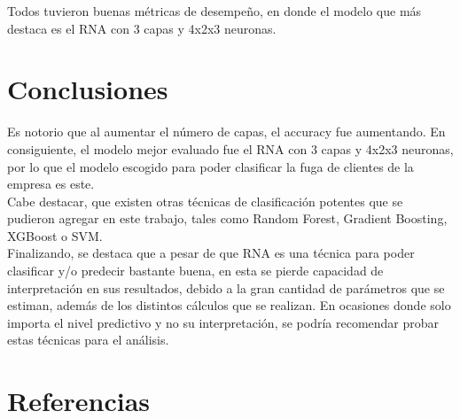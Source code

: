 \documentclass{report}
\begin{document}
Todos tuvieron buenas métricas de desempeño, en donde el modelo que más destaca es el RNA con 3 capas y 4x2x3 neuronas.\\

\chapter{Conclusiones}
Es notorio que al aumentar el número de capas, el accuracy fue aumentando. En consiguiente, el modelo mejor evaluado fue el RNA con 3 capas y 4x2x3 neuronas, por lo que el modelo escogido para poder clasificar la fuga de clientes de la empresa es este.\\

Cabe destacar, que existen otras técnicas de clasificación potentes que se pudieron agregar en este trabajo, tales como Random Forest, Gradient Boosting, XGBoost o SVM.\\

Finalizando, se destaca que a pesar de que RNA es una técnica para poder clasificar y/o predecir bastante buena, en esta se pierde capacidad de interpretación en sus resultados, debido a la gran cantidad de parámetros que se estiman, además de los distintos cálculos que se realizan. En ocasiones donde solo importa el nivel predictivo y no su interpretación, se podría recomendar probar estas técnicas para el análisis.\\

\chapter{Referencias}\label{Referencias}
\end{document}
